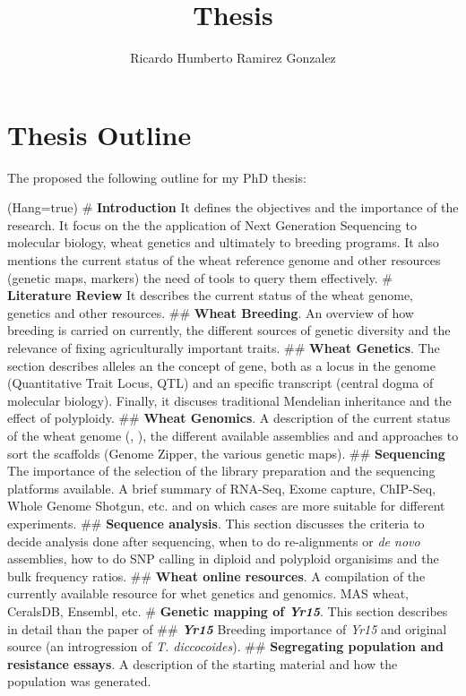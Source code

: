 \documentclass[10pt,a4paper]{article}
\author{Ricardo Humberto Ramirez Gonzalez}
\title{Thesis}
\begin{document}
\section{Thesis Outline}
The proposed the following outline for my PhD thesis:

\begin{easylist}
	\ListProperties(Hang=true)
	# \textbf{Introduction} It defines the objectives and the importance of the research. It focus on the the application of Next Generation Sequencing to molecular biology, wheat genetics and ultimately to breeding programs. It also mentions the current status of the wheat reference genome and other resources (genetic maps, markers) the need of tools to query them effectively. 
	# \textbf{Literature Review} It describes the current status of the wheat genome, genetics and other resources.   
	## \textbf{Wheat Breeding}. An overview of how breeding is carried on currently, the different sources of genetic diversity and the relevance of fixing agriculturally important traits. 
	## \textbf{Wheat Genetics}. The section describes alleles an the concept of gene, both as a locus in the genome (Quantitative Trait Locus, QTL) and an specific transcript (central dogma of molecular biology). Finally, it discuses traditional Mendelian inheritance and the effect of polyploidy.  
	## \textbf{Wheat Genomics}. A description of the current status of the wheat genome (\citet{Mayer2014}, \citet{Chapman2015}), the different available assemblies and and approaches to sort the scaffolds (Genome Zipper, the various genetic maps).  
	## \textbf{Sequencing} The importance of the selection of the library preparation and the sequencing platforms available. A brief summary of RNA-Seq, Exome capture, ChIP-Seq, Whole Genome Shotgun, etc. and on which cases are more suitable for different experiments.  
	## \textbf{Sequence analysis}. This section discusses the criteria to decide analysis done after sequencing, when to do re-alignments or \textit{de novo} assemblies, how to do SNP calling in diploid and polyploid organisims and the bulk frequency ratios.  
	## \textbf{Wheat online resources}. A compilation of the currently available resource for whet genetics and genomics. MAS wheat, CeralsDB, Ensembl, etc.   
	# \textbf{Genetic mapping of \textit{Yr15}}. This section describes in detail than the paper of \citet{Ramirez-Gonzalez-2014}
	## \textbf{\textit{Yr15}} Breeding importance of \textit{Yr15} and original source (an introgression of \textit{T. diccocoides}). 
	## \textbf{Segregating population and resistance essays}. A description of the starting material and how the population was generated.  

\end{easylist}
\end{document}
